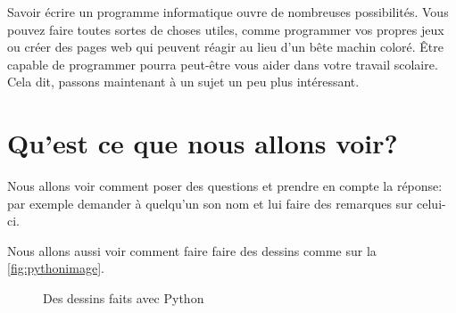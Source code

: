 Savoir écrire un programme informatique ouvre de nombreuses possibilités. Vous pouvez faire toutes sortes de choses utiles, comme programmer vos propres jeux ou créer des pages web qui peuvent réagir au lieu d'un bête machin coloré. Être capable de programmer pourra peut-être vous aider dans votre travail scolaire.
\\


Cela dit, passons maintenant à un sujet un peu plus intéressant.

\section{Qu'est ce que nous allons voir?}
Nous allons voir comment poser des questions et prendre en compte la réponse: par exemple demander à quelqu'un son nom et lui faire des remarques sur celui-ci.

Nous allons aussi voir comment faire faire des dessins comme sur la \autoref{fig:pythonimage}.

\begin{figure}[!ht]
\capstart
\centering
{}
\caption{Des dessins faits avec Python}\label{fig:pythonimage}
\end{figure}

